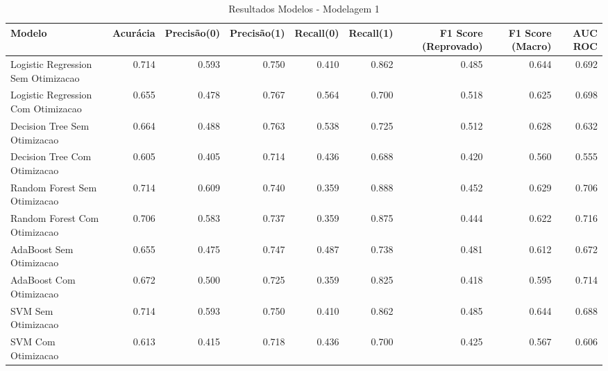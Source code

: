 \begin{table}[H] %
    \centering
    \caption{Resultados Modelos - Modelagem 1}
    \label{tab:resultados_modelagem_1}
    \renewcommand{\arraystretch}{1.25} %
    \begin{adjustwidth}{ -1in }{ -1in } %
    \centering %
    \small %
    \begin{tabular}{lrrrrrrrr}
\toprule
                            Modelo &  Acurácia &  Precisão(0) &  Precisão(1) &  Recall(0) &  Recall(1) &  F1 Score (Reprovado) &  F1 Score (Macro) &  AUC ROC \\
\midrule
Logistic Regression Sem Otimizacao &     0.714 &        0.593 &        0.750 &      0.410 &      0.862 &                 0.485 &             0.644 &    0.692 \\
Logistic Regression Com Otimizacao &     0.655 &        0.478 &        0.767 &      0.564 &      0.700 &                 0.518 &             0.625 &    0.698 \\
      Decision Tree Sem Otimizacao &     0.664 &        0.488 &        0.763 &      0.538 &      0.725 &                 0.512 &             0.628 &    0.632 \\
      Decision Tree Com Otimizacao &     0.605 &        0.405 &        0.714 &      0.436 &      0.688 &                 0.420 &             0.560 &    0.555 \\
      Random Forest Sem Otimizacao &     0.714 &        0.609 &        0.740 &      0.359 &      0.888 &                 0.452 &             0.629 &    0.706 \\
      Random Forest Com Otimizacao &     0.706 &        0.583 &        0.737 &      0.359 &      0.875 &                 0.444 &             0.622 &    0.716 \\
           AdaBoost Sem Otimizacao &     0.655 &        0.475 &        0.747 &      0.487 &      0.738 &                 0.481 &             0.612 &    0.672 \\
           AdaBoost Com Otimizacao &     0.672 &        0.500 &        0.725 &      0.359 &      0.825 &                 0.418 &             0.595 &    0.714 \\
                SVM Sem Otimizacao &     0.714 &        0.593 &        0.750 &      0.410 &      0.862 &                 0.485 &             0.644 &    0.688 \\
                SVM Com Otimizacao &     0.613 &        0.415 &        0.718 &      0.436 &      0.700 &                 0.425 &             0.567 &    0.606 \\
\bottomrule
\end{tabular}
    \end{adjustwidth}
    \renewcommand{\arraystretch}{1.0} %
\end{table}

